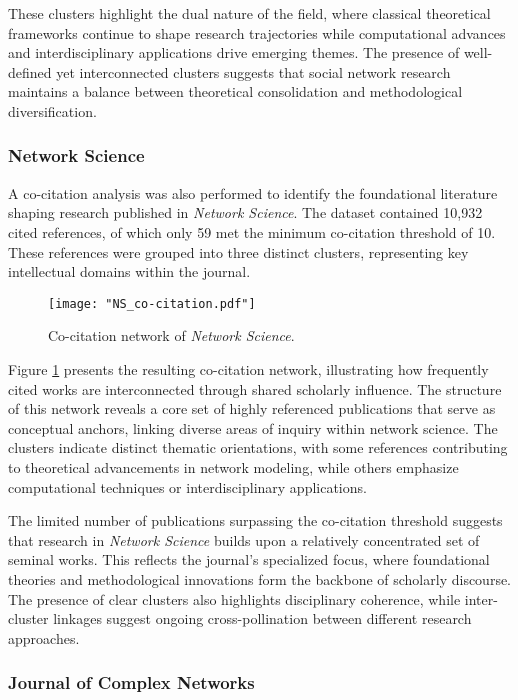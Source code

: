 \documentclass[twocolumn]{article}
\begin{document}
	
	These clusters highlight the dual nature of the field, where classical theoretical frameworks continue to shape research trajectories while computational advances and interdisciplinary applications drive emerging themes. The presence of well-defined yet interconnected clusters suggests that social network research maintains a balance between theoretical consolidation and methodological diversification.
	
	\subsubsection*{Network Science}
		
		A co-citation analysis was also performed to identify the foundational literature shaping research published in \textit{Network Science}. The dataset contained 10,932 cited references, of which only 59 met the minimum co-citation threshold of 10. These references were grouped into three distinct clusters, representing key intellectual domains within the journal.
		
		\begin{figure}[htbp]
			\centering
			\texttt{[image: "NS\_co-citation.pdf"]}
			\caption{Co-citation network of \textit{Network Science}.}
			\label{fig.fig9}
		\end{figure}
		
		Figure \ref{fig.fig9} presents the resulting co-citation network, illustrating how frequently cited works are interconnected through shared scholarly influence. The structure of this network reveals a core set of highly referenced publications that serve as conceptual anchors, linking diverse areas of inquiry within network science. The clusters indicate distinct thematic orientations, with some references contributing to theoretical advancements in network modeling, while others emphasize computational techniques or interdisciplinary applications.
		
		The limited number of publications surpassing the co-citation threshold suggests that research in \textit{Network Science} builds upon a relatively concentrated set of seminal works. This reflects the journal’s specialized focus, where foundational theories and methodological innovations form the backbone of scholarly discourse. The presence of clear clusters also highlights disciplinary coherence, while inter-cluster linkages suggest ongoing cross-pollination between different research approaches.
		
		
		\subsubsection*{Journal of Complex Networks}
		
\end{document}
